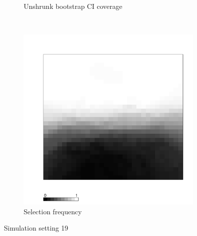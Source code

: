 \documentclass[authoryear, review, 11pt]{elsarticle}
\begin{document}
\begin{figure}
\begin{subfigure}[b]{0.45\textwidth}
		\caption{Unshrunk bootstrap CI coverage}
	\end{subfigure}%
	~ %
	\begin{subfigure}[b]{0.45\textwidth}
	\centering
		\includegraphics[width=\textwidth]{../../figures/simulation/X1.15.19.selection.pdf}
		\caption{Selection frequency}
	\end{subfigure}
	\caption{Simulation setting 19}
\end{figure}
\end{document}

